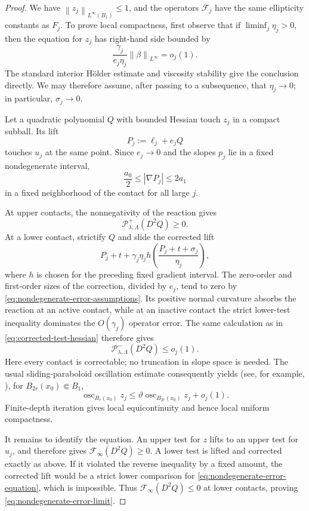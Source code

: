 \documentclass[11pt,letterpaper]{amsart}
\numberwithin{equation}{section}
\DeclareMathOperator{\osc}{osc}
\newcommand{\norm}[1]{\left\lVert #1\right\rVert}
\theoremstyle{definition}
\theoremstyle{remark}
\begin{document}
\begin{proof}
We have $\norm{z_j}_{L^\infty(B_1)}\leq1$, and the operators
$\mathcal F_j$ have the same ellipticity constants as $F_j$. To prove local
compactness, first observe that if $\liminf_j\eta_j>0$, then the equation for
$z_j$ has right-hand side bounded by
$$
\frac{\gamma_j}{e_j\eta_j}\norm\beta_{L^\infty}=o_j(1).
$$
The standard interior H\"older estimate and viscosity stability give the
conclusion directly.  We may therefore assume, after passing to a
subsequence, that $\eta_j\to0$; in particular, $\sigma_j\to0$.

Let a quadratic polynomial $Q$ with bounded Hessian touch
$z_j$ in a compact subball. Its lift
$$
P_j:=\ell_j+e_jQ
$$
touches $u_j$ at the same point. Since $e_j\to0$ and the slopes $p_j$ lie
in a fixed nondegenerate interval,
$$
\frac{a_0}{2}
\leq
|\nabla P_j|
\leq
2a_1
$$
in a fixed neighborhood of the contact for all large $j$.

At upper contacts, the nonnegativity of the reaction gives
$$
\mathcal P^+_{\lambda,\Lambda}(D^2Q)\geq0.
$$
At a lower contact, strictify $Q$ and slide the corrected lift
$$
P_j+t+
\gamma_j\eta_j
h\left(\frac{P_j+t+\sigma_j}{\eta_j}\right),
$$
where $h$ is chosen for the preceding fixed gradient interval. The
zero-order and first-order sizes of the correction, divided by $e_j$, tend
to zero by \eqref{eq:nondegenerate-error-assumptions}.
Its positive normal curvature absorbs the reaction at an active contact,
while at an inactive contact the strict lower-test inequality dominates the
$O(\gamma_j)$ operator error. The same calculation as in
\eqref{eq:corrected-test-hessian} therefore gives
$$
\mathcal P^-_{\lambda,\Lambda}(D^2Q)
\leq o_j(1).
$$
Here every contact is correctable; no truncation in slope space is needed.
The usual sliding-paraboloid oscillation estimate consequently yields (see,
for example, \cite{ImbertSilvestreLargeGradient}), for
$B_{2r}(x_0)\Subset B_1$,
$$
\osc_{B_r(x_0)}z_j
\leq
\vartheta\osc_{B_{2r}(x_0)}z_j+o_j(1).
$$
Finite-depth iteration gives local equicontinuity and hence local uniform
compactness.

It remains to identify the equation. An upper test for $z$ lifts to an
upper test for $u_j$, and therefore gives
$\mathcal F_\infty(D^2Q)\geq0$. A lower test is lifted and corrected exactly
as above. If it violated the reverse inequality by a fixed amount, the
corrected lift would be a strict lower comparison for
\eqref{eq:nondegenerate-error-equation}, which is impossible. Thus
$\mathcal F_\infty(D^2Q)\leq0$ at lower contacts, proving
\eqref{eq:nondegenerate-error-limit}.
\end{proof}
\end{document}
